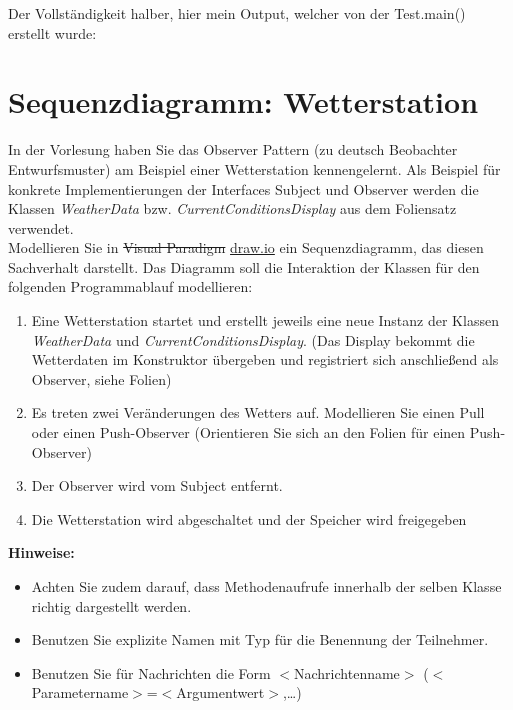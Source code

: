 \documentclass{article}
\begin{document}
\begin{enumerate}[label=\alph*.]
            Der Vollständigkeit halber, hier mein Output, welcher von der Test.main() erstellt wurde:
    \end{enumerate}

    \newpage
    \section*{Sequenzdiagramm: Wetterstation}
    In der Vorlesung haben Sie das Observer Pattern (zu deutsch Beobachter Entwurfsmuster) am Beispiel einer Wetterstation kennengelernt.
    Als Beispiel für konkrete Implementierungen der Interfaces Subject und Observer werden die Klassen \textit{WeatherData} bzw. \textit{CurrentConditionsDisplay} aus dem Foliensatz verwendet.\\

    Modellieren Sie in \sout{Visual Paradigm} \href{draw.io}{draw.io} ein Sequenzdiagramm, das diesen Sachverhalt darstellt.
    Das Diagramm soll die Interaktion der Klassen für den folgenden Programmablauf modellieren:

    \begin{enumerate}
        \item Eine Wetterstation startet und erstellt jeweils eine neue Instanz der Klassen \textit{WeatherData} und \textit{CurrentConditionsDisplay}.
            (Das Display bekommt die Wetterdaten im Konstruktor übergeben und registriert sich anschließend als Observer, siehe Folien)
        \item Es treten zwei Veränderungen des Wetters auf.
            Modellieren Sie einen Pull oder einen Push-Observer (Orientieren Sie sich an den Folien für einen Push-Observer)
        \item Der Observer wird vom Subject entfernt.
        \item Die Wetterstation wird abgeschaltet und der Speicher wird freigegeben
    \end{enumerate}

    \textbf{Hinweise:}
    \begin{itemize}
        \item Achten Sie zudem darauf, dass Methodenaufrufe innerhalb der selben Klasse richtig dargestellt werden.
        \item Benutzen Sie explizite Namen mit Typ für die Benennung der Teilnehmer.
        \item Benutzen Sie für Nachrichten die Form $<$Nachrichtenname$>$ ($<$Parametername$>$=$<$Argumentwert$>$,\dots)
    \end{itemize}
\end{document}
